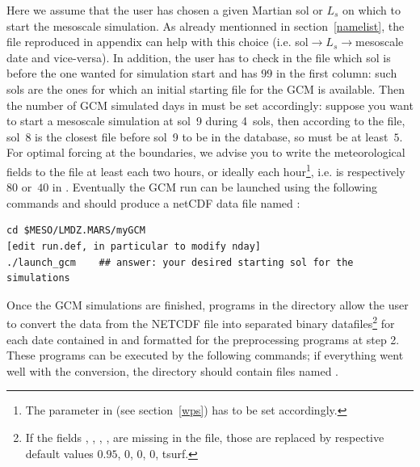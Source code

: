 \sk
Here we assume that the user has chosen a given Martian sol or $L_s$ on which to start the mesoscale simulation. As already mentionned in section~\ref{namelist}, the file  reproduced in appendix can help with this choice (i.e. sol$\rightarrow$$L_s$$\rightarrow$mesoscale date and vice-versa). In addition, the user has to check in the  file which sol is before the one wanted for simulation start and has $99$ in the first column: such sols are the ones for which an initial starting file for the GCM is available. Then the number of GCM simulated days  in  must be set accordingly: suppose you want to start a mesoscale simulation at sol~9 during 4~sols, then according to the  file, sol~8 is the closest file before sol~9 to be in the database, so  must be at least~$5$. For optimal forcing at the boundaries, we advise you to write the meteorological fields to the  file at least each two hours, or ideally each hour\footnote{The parameter  in  (see section~\ref{wps}) has to be set accordingly.}, i.e.  is respectively~$80$ or~$40$ in . Eventually the GCM run can be launched using the following commands and should produce a netCDF data file named :

\begin{verbatim}
cd $MESO/LMDZ.MARS/myGCM
[edit run.def, in particular to modify nday]
./launch_gcm    ## answer: your desired starting sol for the simulations
\end{verbatim}


\sk
Once the GCM simulations are finished, programs in the  directory allow the user to convert the data from the NETCDF  file into separated binary datafiles\footnote{If the fields , , , ,  are missing in the  file, those are replaced by respective default values $0.95$, $0$, $0$, $0$, tsurf.} for each date contained in  and formatted for the preprocessing programs at step 2. These programs can be executed by the following commands; if everything went well with the conversion, the directory  should contain files named . 

